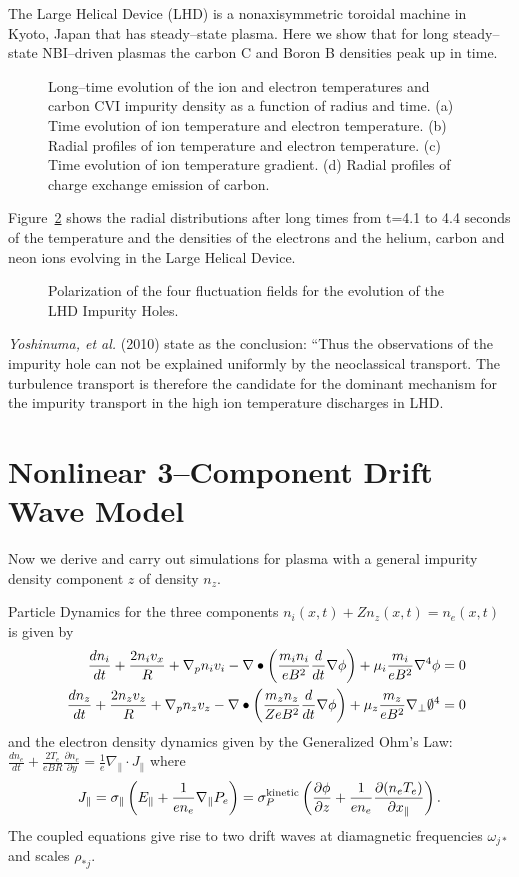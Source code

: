 \documentclass[a4paper,openany,12pt]{book}
\begin{document}
The Large Helical Device (LHD) is a nonaxisymmetric toroidal machine in Kyoto, Japan that has steady--state plasma. Here we show that for long steady--state NBI--driven plasmas the carbon C and Boron B densities peak up in time.
%
\begin{figure}[H]
\centerline{}
\caption{Long--time evolution of the ion and electron temperatures and carbon CVI impurity density as a function of radius and time. (a) Time evolution of ion temperature and electron temperature. (b) Radial profiles of ion temperature and electron temperature. (c) Time evolution of ion temperature gradient. (d) Radial profiles of charge exchange emission of carbon.}
\label{F9.25}
\end{figure}
%
Figure~\ref{F9.26} shows the radial distributions after long times from t=4.1 to 4.4 seconds of the temperature and the densities of the electrons and the helium, carbon and neon ions evolving in the Large Helical Device.
%
\begin{figure}[H]
\centerline{}
\caption{Polarization of the four fluctuation fields for the evolution of the LHD Impurity Holes.}
\label{F9.26}
\end{figure}
%

\emph{Yoshinuma, et al.} (2010) state as the conclusion: ``Thus the observations of the impurity hole can not be explained uniformly by the neoclassical transport. The turbulence transport is therefore the candidate for the dominant mechanism for the impurity transport in the high ion temperature discharges in LHD.

\section{Nonlinear 3--Component Drift Wave Model}

Now we derive and carry out simulations for plasma with a general impurity density component $z$ of density $n_z$.

Particle Dynamics for the three components $n_i(x, t)+Zn_z(x, t)=n_e(x, t)$ is given by
\begin{eqnarray}
&&\frac{dn_i}{dt}+\frac{2n_iv_x}{R}+\nabla_pn_iv_i-\nabla\bullet\left(\frac{m_in_i}{eB^2}
{d\over dt}\nabla\phi\right)+\mu_i\frac{m_i}{eB^2}\nabla^4\phi=0\label{PD3a}\\
&&\frac{dn_z}{dt}+\frac{2n_zv_z}{R}+\nabla_pn_zv_z-\nabla\bullet\left(\frac{m_zn_z}
{ZeB^2}{d\over dt}\nabla\phi\right)+\mu_z\frac{m_z}{eB^2}\nabla_\perp\emptyset^4=0
\label{PD3b}
\end{eqnarray}
and the electron density dynamics given by the Generalized Ohm's Law: 
$\frac{dn_e}{dt}+\frac{2T_e}{eBR}\frac{\partial n_e}{\partial y}=\frac{1}{e}\nabla_\|\cdot J_\|$ where
\begin{equation}
J_\|=\sigma_\|\left(E_\|+\frac{1}{en_e}\nabla_\|P_e\right)=\sigma_P^{\rm kinetic}\left(\frac{\partial\phi}{\partial z}+\frac{1}{en_e}\frac{\partial(n_eT_e)}{\partial x_\|}\right).
\label{Jsigma}
\end{equation}
The coupled equations give rise to two drift waves at diamagnetic frequencies $\omega_{j*}$ and scales $\rho_{*j}$.
\end{document}
